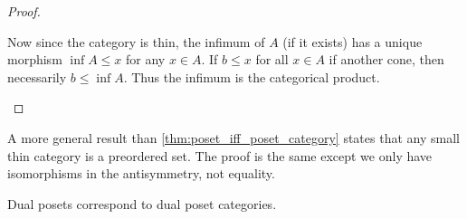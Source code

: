 \begin{proof}
\begin{description}
    Now since the category is thin, the infimum of $A$ (if it exists) has a unique morphism $\inf A \leq x$ for any $x \in A$. If $b \leq x$ for all $x \in A$ if another cone, then necessarily $b \leq \inf A$. Thus the infimum is the categorical product.
  \end{description}
\end{proof}

\begin{note}\label{note:small_thin_category_isomorphic_to_preorder}
  A more general result than \cref{thm:poset_iff_poset_category} states that any small thin category is a preordered set. The proof is the same except we only have isomorphisms in the antisymmetry, not equality.
\end{note}

\begin{proposition}\label{thm:dual_poset_dual_poset_category}
  Dual posets correspond to dual poset categories.
\end{proposition}
